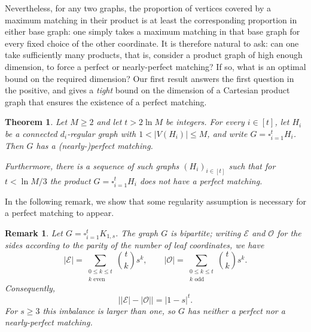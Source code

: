 \documentclass[notitlepage]{scrartcl}
\newtheorem{theorem}{Theorem}
\newtheorem{remark}[thm]{Remark}
\newcommand{\cO}{\mathcal{O}}
\newcommand{\cE}{\mathcal{E}}
\begin{document}
Nevertheless, for any two graphs, the proportion of vertices covered by a maximum matching in their product is at least the corresponding proportion in either base graph: one simply takes a maximum matching in that base graph for every fixed choice of the other coordinate. It is therefore natural to ask: can one take sufficiently many products, that is, consider a product graph of high enough dimension, to force a perfect or nearly-perfect matching? If so, what is an optimal bound on the required dimension? Our first result answers the first question in the positive, and gives a \textit{tight} bound on the dimension of a Cartesian product graph that ensures the existence of a perfect matching.

\begin{theorem}\label{th:deterministic}
Let $M\ge2$ and let $t>2 \ln M$ be integers. For every $i\in[t]$, let $H_i$ be a connected $d_i$-regular graph with $1<|V(H_i)|\le M$, and write $G=\square_{i=1}^t H_i$. Then $G$ has a (nearly-)perfect matching.

Furthermore, there is a sequence of such graphs $(H_i)_{i \in [t]}$ such that for $t<\ln M/3$ the product $G=\square_{i=1}^t H_i$ does not have a perfect matching.
\end{theorem}


In the following remark, we show that some regularity assumption is necessary for a perfect matching to appear. 

\begin{remark}\label{rem:stars}
Let $G=\square_{i=1}^tK_{1,s}$.
The graph $G$ is bipartite; writing $\cE$ and $\cO$ for the sides according to the parity of the number of leaf coordinates, we have
\[
  |\cE|=\sum_{\substack{0\le k\le t\\k\text{ even}}}\binom{t}{k}s^k,
  \qquad
  |\cO|=\sum_{\substack{0\le k\le t\\k\text{ odd}}}\binom{t}{k}s^k.
\]
Consequently,
\[
  \bigl||\cE|-|\cO|\bigr|=|1-s|^t.
\]
For $s\ge3$ this imbalance is larger than one, so $G$ has neither a perfect nor a nearly-perfect matching.
\end{remark}
\end{document}
